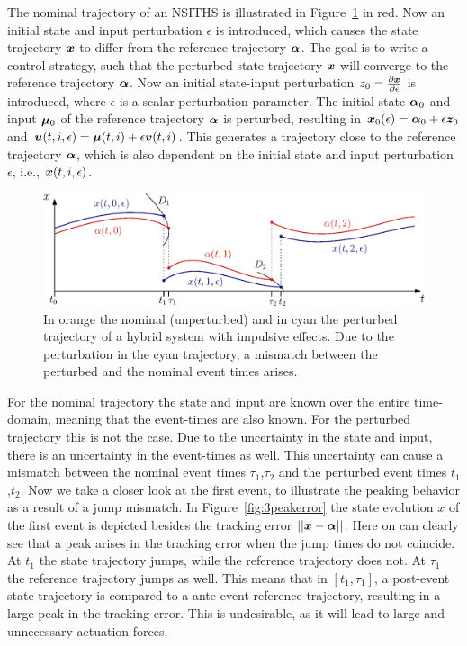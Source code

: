 \documentclass[../DC2017114Bouma.tex]{subfiles}
\begin{document}
The nominal trajectory of an NSITHS is illustrated in Figure~\ref{fig:3perturbedtraj} in red. Now an initial state and input perturbation $\epsilon$ is introduced, which causes the state trajectory ${\boldsymbol{x}}$ to differ from the reference trajectory $\boldsymbol{\alpha}$. The goal is to write a control strategy, such that the perturbed state trajectory ${\boldsymbol{x}}$ will converge to the reference trajectory $\boldsymbol{\alpha}$. Now an initial state-input perturbation $z_0 = \frac{\partial{\boldsymbol{x}}}{\partial\epsilon}$ is introduced, where $\epsilon$ is a scalar perturbation parameter. The initial state $\boldsymbol{\alpha}_0$ and input $\boldsymbol{\mu}_0$ of the reference trajectory $\boldsymbol{\alpha}$ is perturbed, resulting in ${\boldsymbol{x}}_0(\epsilon) = \boldsymbol{\alpha}_0 + \epsilon{\boldsymbol{z}}_0$ and ${\boldsymbol{u}}(t,i,\epsilon) = \boldsymbol{\mu}(t,i) + \epsilon{\boldsymbol{v}}(t,i)$. This generates a trajectory close to the reference trajectory $\boldsymbol{\alpha}$, which is also dependent on the initial state and input perturbation $\epsilon$, i.e., ${\boldsymbol{x}}(t,i,\epsilon)$.
%
%
\begin{figure}[h]
\centering
\includegraphics[width=.8\textwidth]{perturbedtraj.eps}\caption{In orange the nominal (unperturbed) and in cyan the perturbed trajectory of a hybrid system with impulsive effects. Due to the perturbation in the cyan trajectory, a mismatch between the perturbed and the nominal event times arises.} \label{fig:3perturbedtraj}
\end{figure}
For the nominal trajectory the state and input are known over the entire time-domain, meaning that the event-times are also known. For the perturbed trajectory this is not the case. Due to the uncertainty in the state and input, there is an uncertainty in the event-times as well. This uncertainty can cause a mismatch between the nominal event times $\tau_1$,$\tau_2$ and the perturbed event times $t_1$,$t_2$. Now we take a closer look at the first event, to illustrate the peaking behavior as a result of a jump mismatch. In Figure~\ref{fig:3peakerror} the state evolution $x$ of the first event is depicted besides the tracking error $||{\boldsymbol{x}}-\boldsymbol{\alpha}||$. Here on can clearly see that a peak arises in the tracking error when the jump times do not coincide. At $t_1$ the state trajectory jumps, while the reference trajectory does not. At $\tau_1$ the reference trajectory jumps as well. This means that in $[t_1,\tau_1]$, a post-event state trajectory is compared to a ante-event reference trajectory, resulting in a large peak in the tracking error. This is undesirable, as it will lead to large and unnecessary actuation forces.
\end{document}
